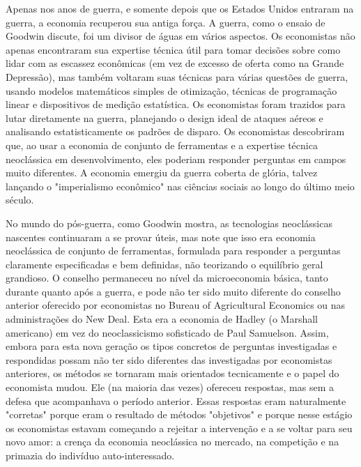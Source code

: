 \documentclass[a4paper,12pt]{article}[abntex2]
\begin{document}
Apenas nos anos de guerra, e somente depois que os Estados Unidos entraram na guerra, a economia recuperou sua antiga força. A guerra, como o ensaio de Goodwin discute, foi um divisor de águas em vários aspectos. Os economistas não apenas encontraram sua expertise técnica útil para tomar decisões sobre como lidar com as escassez econômicas (em vez de excesso de oferta como na Grande Depressão), mas também voltaram suas técnicas para várias questões de guerra, usando modelos matemáticos simples de otimização, técnicas de programação linear e dispositivos de medição estatística. Os economistas foram trazidos para lutar diretamente na guerra, planejando o design ideal de ataques aéreos e analisando estatisticamente os padrões de disparo. Os economistas descobriram que, ao usar a economia de conjunto de ferramentas e a expertise técnica neoclássica em desenvolvimento, eles poderiam responder perguntas em campos muito diferentes. A economia emergiu da guerra coberta de glória, talvez lançando o "imperialismo econômico" nas ciências sociais ao longo do último meio século.

No mundo do pós-guerra, como Goodwin mostra, as tecnologias neoclássicas nascentes continuaram a se provar úteis, mas note que isso era economia neoclássica de conjunto de ferramentas, formulada para responder a perguntas claramente especificadas e bem definidas, não teorizando o equilíbrio geral grandioso. O conselho permaneceu no nível da microeconomia básica, tanto durante quanto após a guerra, e pode não ter sido muito diferente do conselho anterior oferecido por economistas no Bureau of Agricultural Economics ou nas administrações do New Deal. Esta era a economia de Hadley (o Marshall americano) em vez do neoclassicismo sofisticado de Paul Samuelson. Assim, embora para esta nova geração os tipos concretos de perguntas investigadas e respondidas possam não ter sido diferentes das investigadas por economistas anteriores, os métodos se tornaram mais orientados tecnicamente e o papel do economista mudou. Ele (na maioria das vezes) ofereceu respostas, mas sem a defesa que acompanhava o período anterior. Essas respostas eram naturalmente "corretas" porque eram o resultado de métodos "objetivos" e porque nesse estágio os economistas estavam começando a rejeitar a intervenção e a se voltar para seu novo amor: a crença da economia neoclássica no mercado, na competição e na primazia do indivíduo auto-interessado.
\end{document}
